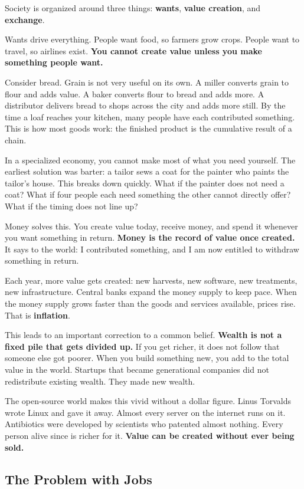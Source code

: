 Society is organized around three things: \textbf{wants}, \textbf{value creation}, and \textbf{exchange}.

Wants drive everything. People want food, so farmers grow crops. People want to travel, so airlines exist. \textbf{You cannot create value unless you make something people want.}

Consider bread. Grain is not very useful on its own. A miller converts grain to flour and adds value. A baker converts flour to bread and adds more. A distributor delivers bread to shops across the city and adds more still. By the time a loaf reaches your kitchen, many people have each contributed something. This is how most goods work: the finished product is the cumulative result of a chain.

In a specialized economy, you cannot make most of what you need yourself. The earliest solution was barter: a tailor sews a coat for the painter who paints the tailor's house. This breaks down quickly. What if the painter does not need a coat? What if four people each need something the other cannot directly offer? What if the timing does not line up?

Money solves this. You create value today, receive money, and spend it whenever you want something in return. \textbf{Money is the record of value once created.} It says to the world: I contributed something, and I am now entitled to withdraw something in return.

Each year, more value gets created: new harvests, new software, new treatments, new infrastructure. Central banks expand the money supply to keep pace. When the money supply grows faster than the goods and services available, prices rise. That is \textbf{inflation}.

This leads to an important correction to a common belief. \textbf{Wealth is not a fixed pile that gets divided up.} If you get richer, it does not follow that someone else got poorer. When you build something new, you add to the total value in the world. Startups that became generational companies did not redistribute existing wealth. They made new wealth.

The open-source world makes this vivid without a dollar figure. Linus Torvalds wrote Linux and gave it away. Almost every server on the internet runs on it. Antibiotics were developed by scientists who patented almost nothing. Every person alive since is richer for it. \textbf{Value can be created without ever being sold.}

\subsection{The Problem with Jobs}


